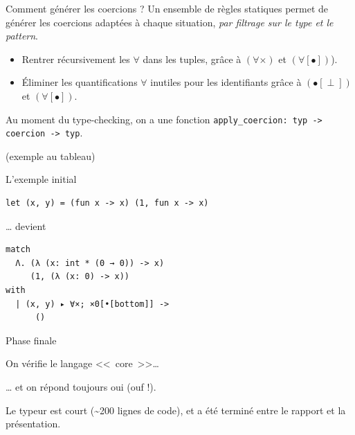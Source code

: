 \documentclass[final]{beamer}
\newcommand{\red}[1]{\textcolor[HTML]{F7800A}{#1}}
\begin{document}
\begin{frame}{Comment générer les coercions ?}
Un ensemble de règles statiques permet de générer les coercions adaptées à
chaque situation, \emph{par filtrage sur le type et le pattern}.

\begin{itemize}
  \item Rentrer récursivement les $\forall$ dans les tuples, grâce à
    $(\forall\times)$ et $(\forall[\bullet])$).
  \item Éliminer les quantifications $\forall$ inutiles pour les identifiants
    grâce à $(\bullet[\perp])$ et $(\forall[\bullet])$.
\end{itemize}

Au moment du type-checking, on a une fonction \texttt{apply\_coercion: typ ->
coercion -> typ}.

\begin{flushright}
  \footnotesize (exemple au tableau)
\end{flushright}

\end{frame}

\begin{frame}[fragile]{L'exemple initial}

  \begin{verbatim}
let (x, y) = (fun x -> x) (1, fun x -> x)
  \end{verbatim}

  … devient

  \begin{verbatim}
match
  Λ. (λ (x: int * (0 → 0)) -> x)
     (1, (λ (x: 0) -> x))
with
  | (x, y) ▸ ∀×; ×0[•[bottom]] ->
      ()
  \end{verbatim}

\end{frame}

\begin{frame}{Phase finale}
  \begin{center}
On vérifie le langage <<~core~>>…

\vspace{5ex}

… et on répond toujours oui (\red{ouf !}).
  \end{center}

  \vspace{2em}

  Le typeur est court (\textasciitilde 200 lignes de code), et a été terminé entre
  le rapport et la présentation.
\end{frame}
\end{document}

